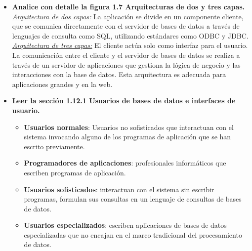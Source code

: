 \documentclass[letterpaper,12pt]{article}
\begin{document}
\begin{sloppypar}
\begin{itemize}
    \item \textbf{Analice con detalle la figura 1.7 Arquitecturas de dos y tres capas. }\\ \textit{\underline{Arquitectura de dos capas:}} La aplicación se divide en un componente cliente, que se comunica directamente con el servidor de bases de datos a través de lenguajes de consulta como SQL, utilizando estándares como ODBC y JDBC. 
    \vspace{0.3cm}\\ 
    \textit{\underline{Arquitectura de tres capas:}} El cliente actúa solo como interfaz para el usuario. La comunicación entre el cliente y el servidor de bases de datos se realiza a través de un servidor de aplicaciones que gestiona la lógica de negocio y las interacciones con la base de datos. Esta arquitectura es adecuada para aplicaciones grandes y en la web.
    \newpage
    \item \textbf{Leer la sección 1.12.1 Usuarios de bases de datos e interfaces de usuario.}
    \begin{itemize}
        \item \textbf{Usuarios normales}: Usuarios no sofisticados que interactuan con el sistema invocando alguno de los programas de aplicación que se han escrito previamente.
        \item \textbf{Programadores de aplicaciones}: profesionales informáticos que escriben programas de aplicación.
        \item \textbf{Usuarios sofisticados}: interactuan con el sistema sin escribir programas, formulan sus consultas en un lenguaje de consultas de bases de datos.
        \item \textbf{Usuarios especializados}: escriben aplicaciones de bases de datos especializadas que no encajan en el marco tradicional del procesamiento de datos.
    \end{itemize}



\end{itemize}
\end{sloppypar}
\end{document}
